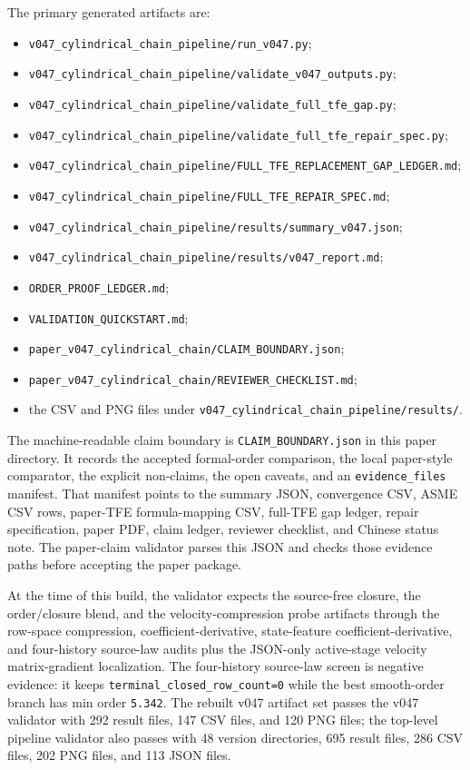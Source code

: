 \documentclass[11pt]{article}
\newcommand{\tfe}{TFE}
\newcommand{\artifact}[1]{\texttt{#1}}
\begin{document}
The primary generated artifacts are:
\begin{itemize}
  \item \artifact{v047\_cylindrical\_chain\_pipeline/run\_v047.py};
  \item \artifact{v047\_cylindrical\_chain\_pipeline/validate\_v047\_outputs.py};
  \item \artifact{v047\_cylindrical\_chain\_pipeline/validate\_full\_tfe\_gap.py};
  \item \artifact{v047\_cylindrical\_chain\_pipeline/validate\_full\_tfe\_repair\_spec.py};
  \item \artifact{v047\_cylindrical\_chain\_pipeline/FULL\_TFE\_REPLACEMENT\_GAP\_LEDGER.md};
  \item \artifact{v047\_cylindrical\_chain\_pipeline/FULL\_TFE\_REPAIR\_SPEC.md};
  \item \artifact{v047\_cylindrical\_chain\_pipeline/results/summary\_v047.json};
  \item \artifact{v047\_cylindrical\_chain\_pipeline/results/v047\_report.md};
  \item \artifact{ORDER\_PROOF\_LEDGER.md};
  \item \artifact{VALIDATION\_QUICKSTART.md};
  \item \artifact{paper\_v047\_cylindrical\_chain/CLAIM\_BOUNDARY.json};
  \item \artifact{paper\_v047\_cylindrical\_chain/REVIEWER\_CHECKLIST.md};
  \item the CSV and PNG files under \artifact{v047\_cylindrical\_chain\_pipeline/results/}.
\end{itemize}

The machine-readable claim boundary is \artifact{CLAIM\_BOUNDARY.json} in
this paper directory.  It records the accepted formal-order comparison, the
local paper-style comparator, the explicit non-claims, the open caveats, and
an \nolinkurl{evidence_files} manifest.  That manifest points to the summary
JSON, convergence CSV, ASME CSV rows, paper-\tfe{} formula-mapping CSV,
full-\tfe{} gap ledger, repair specification, paper PDF, claim ledger,
reviewer checklist, and Chinese status note.  The paper-claim validator parses
this JSON and checks those evidence paths before accepting the paper package.

At the time of this build, the validator expects the source-free closure, the
order/closure blend, and the velocity-compression probe artifacts through the
row-space compression, coefficient-derivative, state-feature coefficient-derivative,
and four-history source-law audits plus the JSON-only active-stage velocity
matrix-gradient localization.  The four-history source-law screen is negative
evidence: it keeps \texttt{terminal\_closed\_row\_count=0} while the best
smooth-order branch has min order \texttt{5.342}.  The rebuilt v047 artifact set passes the
v047 validator with 292 result files, 147 CSV files, and 120 PNG files; the
top-level pipeline validator also passes with 48 version directories, 695
result files, 286 CSV files, 202 PNG files, and 113 JSON files.
\end{document}
